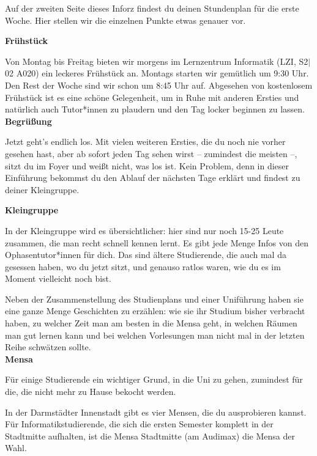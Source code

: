 {Auf der zweiten Seite dieses Inforz findest du deinen Stundenplan für die erste Woche. Hier stellen wir die einzelnen Punkte etwas genauer vor.}
{\textbf{Frühstück}

    Von Montag bis Freitag bieten wir morgens im Lernzentrum Informatik (LZI, S2$|$02 A020) ein leckeres Frühstück an. Montags starten wir gemütlich um 9:30 Uhr. Den Rest der Woche sind wir schon um 8:45 Uhr auf.  Abgesehen von kostenlosem Frühstück ist es eine schöne Gelegenheit, um in Ruhe mit anderen Ersties und natürlich auch Tutor*innen zu plaudern und den Tag locker beginnen zu lassen.\\

    \noindent\textbf{Begrüßung}

    Jetzt geht's endlich los. Mit vielen weiteren Ersties, die du noch nie vorher gesehen hast, aber ab sofort jeden Tag sehen wirst – zumindest die meisten –, sitzt du im Foyer und weißt nicht, was los ist. Kein Problem, denn in dieser Einführung bekommst du den Ablauf der nächsten Tage erklärt und findest zu deiner Kleingruppe.


    \noindent\textbf{Kleingruppe}

    In der Kleingruppe wird es übersichtlicher: hier sind nur noch 15-25 Leute zusammen, die man recht schnell kennen lernt. Es gibt jede Menge Infos von den Ophasentutor*innen für dich. Das sind ältere Studierende, die auch mal da gesessen haben, wo du jetzt sitzt, und genauso ratlos waren, wie du es im Moment vielleicht noch bist.

    Neben der Zusammenstellung des Studienplans und einer Uniführung haben sie eine ganze Menge Geschichten zu erzählen: wie sie ihr Studium bisher verbracht haben, zu welcher Zeit man am besten in die Mensa geht, in welchen Räumen man gut lernen kann und bei welchen Vorlesungen man nicht mal in der letzten Reihe schwätzen sollte.\\

    \noindent\textbf{Mensa}

    Für einige Studierende ein wichtiger Grund, in die Uni zu gehen, zumindest für die, die nicht mehr zu Hause bekocht werden.

    In der Darmstädter Innenstadt gibt es vier Mensen, die du ausprobieren kannst. Für Informatikstudierende, die sich die ersten Semester komplett in der Stadtmitte aufhalten, ist die Mensa Stadtmitte (am Audimax) die Mensa der Wahl.

}
